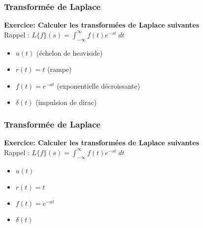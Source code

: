 \documentclass{beamer}
\begin{document}
\begin{frame} 
\frametitle{Transformée de Laplace}

\textbf{Exercice: Calculer les transformées de Laplace suivantes}\\
\vspace{0.3cm}
Rappel : $L\{f\}(s) = \displaystyle \int^{\infty}_{-\infty} f(t) e^{-st} \; dt$
\vspace{0.3cm}
\begin{itemize}
\item $u(t)$ (échelon de heaviside)
\vspace{0.2cm}
\item $r(t) = t$ (rampe)
\vspace{0.2cm}
\item $f(t) = e^{-at}$ (exponentielle décroissante)
\vspace{0.2cm}
\item $\delta (t)$ (impulsion de dirac) 
\end{itemize}

\end{frame} 

\begin{frame} 
\frametitle{Transformée de Laplace}

\textbf{Exercice: Calculer les transformées de Laplace suivantes}\\
\vspace{0.3cm}
Rappel : $L\{f\}(s) = \displaystyle \int^{\infty}_{-\infty} f(t) e^{-st} \; dt$
\vspace{0.3cm}
\begin{itemize}
\item $u(t)$   
\vspace{0.2cm}
\item $r(t) = t$  
\vspace{0.2cm}
\item $f(t) = e^{-at}$  
\vspace{0.2cm}
\item $\delta (t)$  
\end{itemize}

\end{frame}
\end{document}
